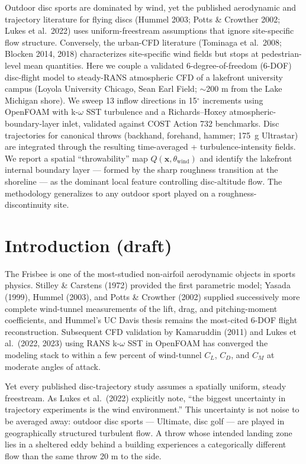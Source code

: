\documentclass[11pt,letterpaper]{article}
\begin{document}
Outdoor disc sports are dominated by wind, yet the published aerodynamic and trajectory literature for flying discs (Hummel 2003; Potts \& Crowther 2002; Lukes et al.\ 2022) uses uniform-freestream assumptions that ignore site-specific flow structure. Conversely, the urban-CFD literature (Tominaga et al.\ 2008; Blocken 2014, 2018) characterizes site-specific wind fields but stops at pedestrian-level mean quantities. Here we couple a validated 6-degree-of-freedom (6-DOF) disc-flight model to steady-RANS atmospheric CFD of a lakefront university campus (Loyola University Chicago, Sean Earl Field; $\sim$200 m from the Lake Michigan shore). We sweep 13 inflow directions in 15$^\circ$ increments using OpenFOAM with k-$\omega$ SST turbulence and a Richards--Hoxey atmospheric-boundary-layer inlet, validated against COST Action 732 benchmarks. Disc trajectories for canonical throws (backhand, forehand, hammer; 175~g Ultrastar) are integrated through the resulting time-averaged + turbulence-intensity fields. We report a spatial ``throwability'' map $Q(\mathbf{x}, \theta_{\text{wind}})$ and identify the lakefront internal boundary layer --- formed by the sharp roughness transition at the shoreline --- as the dominant local feature controlling disc-altitude flow. The methodology generalizes to any outdoor sport played on a roughness-discontinuity site.

\section{Introduction (draft)}

The Frisbee is one of the most-studied non-airfoil aerodynamic objects in sports physics. Stilley \& Carstens (1972) provided the first parametric model; Yasada (1999), Hummel (2003), and Potts \& Crowther (2002) supplied successively more complete wind-tunnel measurements of the lift, drag, and pitching-moment coefficients, and Hummel's UC Davis thesis remains the most-cited 6-DOF flight reconstruction. Subsequent CFD validation by Kamaruddin (2011) and Lukes et al.\ (2022, 2023) using RANS k-$\omega$ SST in OpenFOAM has converged the modeling stack to within a few percent of wind-tunnel $C_L$, $C_D$, and $C_M$ at moderate angles of attack.

Yet every published disc-trajectory study assumes a spatially uniform, steady freestream. As Lukes et al.\ (2022) explicitly note, ``the biggest uncertainty in trajectory experiments is the wind environment.'' This uncertainty is not noise to be averaged away: outdoor disc sports --- Ultimate, disc golf --- are played in geographically structured turbulent flow. A throw whose intended landing zone lies in a sheltered eddy behind a building experiences a categorically different flow than the same throw 20 m to the side.
\end{document}
